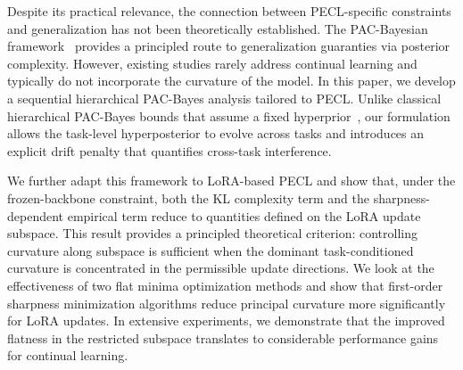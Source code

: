 \documentclass{article}
\theoremstyle{plain}
\theoremstyle{definition}
\theoremstyle{remark}
\begin{document}









Despite its practical relevance, the connection between PECL-specific constraints and generalization has not been theoretically established. The PAC-Bayesian framework~\cite{mcallesterPACBayesianStochasticModel2003,pentinaPACBayesianBoundLifelong2014,germainPACBayesianTheoryMeets2016,NEURIPS2024_xinrui} provides a principled route to generalization guaranties via posterior complexity. However, existing studies rarely address continual learning and typically do not incorporate the curvature of the model. 
In this paper, we develop a sequential hierarchical PAC-Bayes analysis tailored to PECL. Unlike classical hierarchical PAC-Bayes bounds that assume a fixed hyperprior~\cite{pentinaPACBayesianBoundLifelong2014}, our formulation allows the task-level hyperposterior to evolve across tasks and introduces an explicit drift penalty that quantifies cross-task interference. 


We further adapt this framework to LoRA-based PECL and show that, under the frozen-backbone constraint, both the KL complexity term and the sharpness-dependent empirical term reduce to quantities defined on the LoRA update subspace. This result provides a principled theoretical criterion: controlling curvature along subspace is sufficient when the dominant task-conditioned curvature is concentrated in the permissible update directions.
We look at the effectiveness of two flat minima optimization methods and show that first-order sharpness minimization algorithms reduce principal curvature more significantly for LoRA updates. 
In extensive experiments, we demonstrate that the improved flatness in the restricted subspace translates to considerable performance gains for continual learning.
\end{document}
